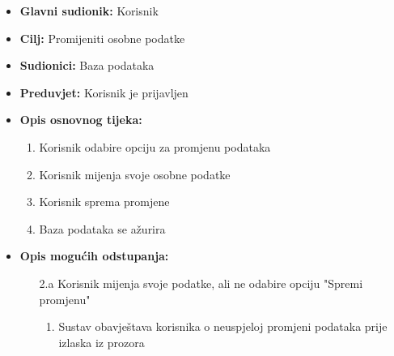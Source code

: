                         \noindent {}
					\begin{itemize}
	
						\item \textbf{Glavni sudionik: }Korisnik
						\item  \textbf{Cilj:} Promijeniti osobne podatke
						\item  \textbf{Sudionici:} Baza podataka
						\item  \textbf{Preduvjet:} Korisnik je prijavljen
						\item  \textbf{Opis osnovnog tijeka:}
						
						\item[] \begin{enumerate}
							\item Korisnik odabire opciju za promjenu podataka
                                \item Korisnik mijenja svoje osobne podatke
                                \item Korisnik sprema promjene
                                \item Baza podataka se ažurira
						\end{enumerate}

                            \item  \textbf{Opis mogućih odstupanja:}
						
						\item[] \begin{enumerate}
	
							\item[2.a] Korisnik mijenja svoje podatke, ali ne odabire opciju "Spremi promjenu"
							\item[] \begin{enumerate}
								
								\item Sustav obavještava korisnika o neuspjeloj promjeni podataka prije izlaska iz prozora\\
								
							\end{enumerate}
			
							
						\end{enumerate}
						
					\end{itemize}


